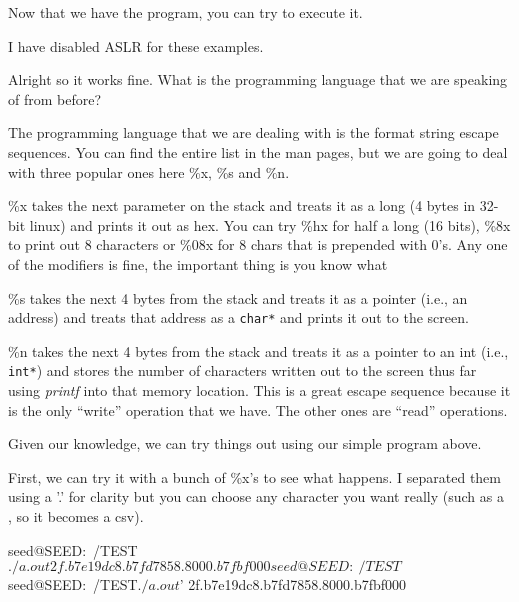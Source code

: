 Now that we have the program, you can try to execute it. 

\begin{note}
I have disabled ASLR for these examples. 
\end{note}

 
Alright so it works fine. What is the programming language that we are speaking of from before? 
 
The programming language that we are dealing with is the format string escape sequences. You can find the entire list in the man pages, but we are going to deal with three popular ones here \%x, \%s and \%n. 
 
\%x takes the next parameter on the stack and treats it as a long (4 bytes in 32-bit linux) and prints it out as hex. You can try \%hx for half a long (16 bits), \%8x to print out 8 characters or \%08x for 8 chars that is prepended with 0’s. Any one of the modifiers is fine, the important thing is you know what %
 
\%s takes the next 4 bytes from the stack and treats it as a pointer (i.e., an address) and treats that address as a {\tt char*} and prints it out to the screen. 
 
\%n takes the next 4 bytes from the stack and treats it as a pointer to an int (i.e., {\tt int*}) and stores the number of characters written out to the screen thus far using {\em printf} into that memory location. This is a great escape sequence because it is the only ``write'' operation that we have. The other ones are ``read'' operations. 
 
Given our knowledge, we can try things out using our simple program above. 
 
First, we can try it with a bunch of \%x's to see what happens. I separated them using a '.' for clarity but you can choose any character you want really (such as a , so it becomes a csv). 

\begin{code} 
seed@SEED:~/TEST$ ./a.out %
2f.b7e19dc8.b7fd7858.8000.b7fbf000
seed@SEED:~/TEST$  
seed@SEED:~/TEST$ ./a.out $'%
2f.b7e19dc8.b7fd7858.8000.b7fbf000 
\end{code}
 
